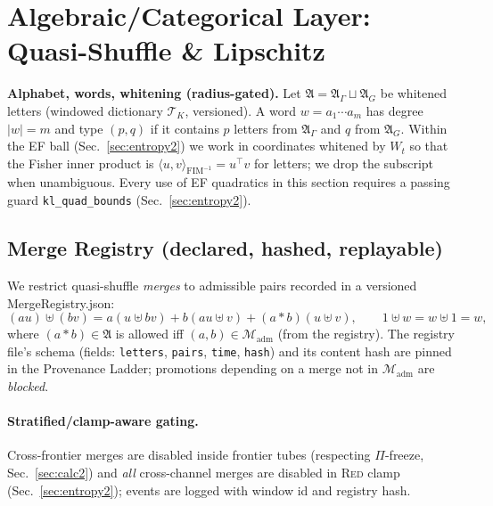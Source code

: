 \documentclass[10pt]{article}
\newcommand{\FIM}{\mathrm{FIM}}
\begin{document}
\section{Algebraic/Categorical Layer: Quasi-Shuffle \& Lipschitz}\label{sec:adv-structures2}

\noindent\textbf{Alphabet, words, whitening (radius-gated).}
Let $\mathfrak A=\mathfrak A_\Gamma \sqcup \mathfrak A_G$ be whitened letters (windowed dictionary $\mathcal T_K$, versioned).
A word $w=a_1\cdots a_m$ has degree $|w|=m$ and type $(p,q)$ if it contains $p$ letters from $\mathfrak A_\Gamma$ and $q$ from $\mathfrak A_G$.
Within the EF ball (Sec.~\ref{sec:entropy2}) we work in coordinates whitened by $W_t$ so that the Fisher inner product is
$\langle u,v\rangle_{\FIM^{-1}}=u^\top v$ for letters; we drop the subscript when unambiguous.
Every use of EF quadratics in this section requires a passing guard \texttt{kl\_quad\_bounds} (Sec.~\ref{sec:entropy2}).

\subsection*{Merge Registry (declared, hashed, replayable)}
We restrict quasi-shuffle \emph{merges} to admissible pairs recorded in a versioned \textsf{MergeRegistry.json}:
\[
(a u)\uplus(b v)=a(u\uplus b v) + b(a u\uplus v) + (a\ast b)(u\uplus v),\qquad 1\uplus w=w\uplus 1=w,
\]
where $(a\ast b)\in\mathfrak A$ is allowed iff $(a,b)\in\mathcal M_{\mathrm{adm}}$ (from the registry).
The registry file’s schema (fields: \texttt{letters}, \texttt{pairs}, \texttt{time}, \texttt{hash}) and its content hash are pinned in the Provenance Ladder; promotions depending on a merge not in $\mathcal M_{\mathrm{adm}}$ are \emph{blocked}.

\paragraph{Stratified/clamp-aware gating.}
Cross-frontier merges are disabled inside frontier tubes (respecting $\Pi$-freeze, Sec.~\ref{sec:calc2}) and \emph{all} cross-channel merges are disabled in \textsc{Red} clamp (Sec.~\ref{sec:entropy2}); events are logged with window id and registry hash.

\end{document}

